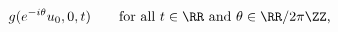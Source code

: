 \begin{equation*}
  g(e^{-i\theta} u_0, 0, t)\qquad \text{for all $t\in\RR$ and
  $\theta\in\RR/2\pi\ZZ$,}
\end{equation*}

